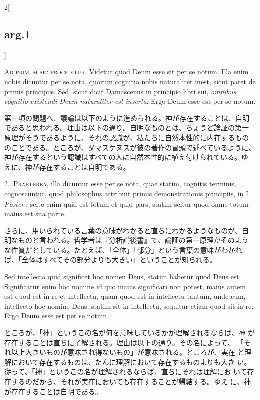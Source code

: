 \documentclass[paper=a4paper,fontsize=10pt,jafontsize=9pt,titlepage]{jlreq}
\begin{document}
\begin{paracol}{2}[\subsection{arg.1}]

{\huge A}{\scshape d primum sic proceditur}. Videtur quod Deum esse sit per
se notum. Illa enim nobis dicuntur per se nota, quorum cognitio nobis
naturaliter inest, sicut patet de primis principiis. Sed, sicut dicit
Damascenus in principio libri sui, {\itshape omnibus cognitio existendi
Deum naturaliter est inserta}. Ergo Deum esse est per se notum.

\switchcolumn

第一項の問題へ、議論は以下のように進められる。神が存在することは、自明
であると思われる。理由は以下の通り。自明なものとは、ちょうど論証の第一
原理がそうであるように、それの認識が、私たちに自然本性的に内在するもの
のことである。ところが、ダマスケヌスが彼の著作の冒頭で述べているように、
神が存在するという認識はすべての人に自然本性的に植え付けられている。ゆ
えに、神が存在することは自明である。


2.~{\scshape Praeterea}, illa dicuntur esse per se nota,
quae statim, cognitis terminis, cognoscuntur, quod philosophus attribuit
primis demonstrationis principiis, in I {\itshape Poster}.: scito enim quid est
totum et quid pars, statim scitur quod omne totum maius est sua
parte.

\switchcolumn

さらに、用いられている言葉の意味がわかると直ちにわかるようなものが、自
明なものと言われる。哲学者は『分析論後書』で、論証の第一原理がそのよう
な性質だとしている。たとえば、「全体」「部分」という言葉の意味がわかれ
ば、「全体はすべてその部分よりも大きい」ということが知られる。

\switchcolumn*

Sed intellecto quid significet hoc nomen Deus, statim habetur quod
Deus est. Significatur enim hoc nomine id quo maius significari non
potest, maius autem est quod est in re et intellectu, quam quod est in
intellectu tantum, unde cum, intellecto hoc nomine Deus, statim sit in
intellectu, sequitur etiam quod sit in re. Ergo Deum esse est per se
notum.

\switchcolumn

ところが、「神」というこの名が何を意味しているかが理解されるならば、神
が存在することは直ちに了解される。理由は以下の通り。その名によって、
「それ以上大きいものが意味され得ないもの」が意味される。ところが、実在
と理解において存在するものは、たんに理解において存在するものよりも大き
い。従って、「神」というこの名が理解されるならば、直ちにそれは理解にお
いて存在するのだから、それが実在においても存在することが帰結する。ゆえ
に、神が存在することは自明である。


\end{paracol}
\end{document}
